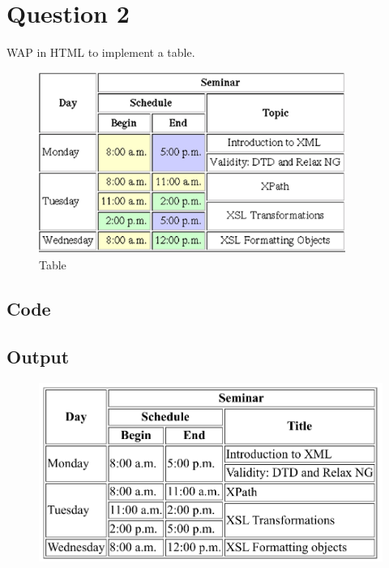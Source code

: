 \documentclass{article}
\begin{document}
\newpage
\section*{Question 2}

WAP in HTML to implement a table.

\begin{figure}[H]
  \caption{Table}
  \centering
  \includegraphics[width=10cm]{./img/2.png}
\end{figure}

\newpage
\subsection*{Code}

\newpage
\subsection*{Output}
\begin{figure}[H]
  \centering
  \includegraphics[width=13cm]{2/out.png}
\end{figure}
\end{document}
